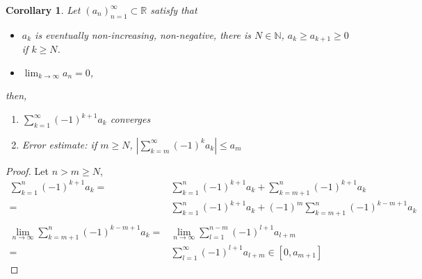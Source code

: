 \documentclass[12pt]{article}
\theoremstyle{plain}
\newtheorem{corollary}{Corollary}[subsection]
\newcommand{\abs}[1]{\left| #1 \right|}
\newcommand{\mN}{{\mathbb{N}}}
\newcommand{\mR}{{\mathbb{R}}}
\begin{document}
\begin{corollary}
	Let $(a_n)_{n=1}^{\infty} \subset \mR$ satisfy that 
	\begin{itemize}
		\item $a_k$ is eventually non-increasing, non-negative, there is $N \in
			\mN$, $a_k \geq a_{k+1} \geq 0$ if $k \geq N$. 
		\item $\lim_{k\to\infty} a_n = 0$,
	\end{itemize}
	then, 
	\begin{enumerate}
		\item $\sum_{k=1}^{\infty} (-1)^{k+1}a_k$ converges
		\item Error estimate: if $m \geq N$, $\abs{\sum_{k=m}^{\infty}(-1)^k a_k}
			\leq a_m$
	\end{enumerate}
\end{corollary}
\begin{proof}
	Let $n > m \geq N$, 
	\begin{align*}
		\sum_{k=1}^n (-1)^{k+1}a_k 
		=& \sum_{k=1}^n (-1)^{k+1}a_k + \sum_{k=m+1}^n(-1)^{k+1} a_k	\\
		=& \sum_{k=1}^n (-1)^{k+1}a_k + (-1)^m \sum_{k=m+1}^n(-1)^{k-m+1} a_k\\\\
		\lim_{n\to\infty} \sum_{k=m+1}^n(-1)^{k-m+1} a_k 
		=& \lim_{n\to\infty} \sum_{l=1}^{n-m} (-1)^{l+1} a_{l+m}	\\
		=& \sum_{l=1}^{\infty} (-1)^{l+1} a_{l+m} \in [0, a_{m+1}]
	\end{align*}
\end{proof}
\end{document}
